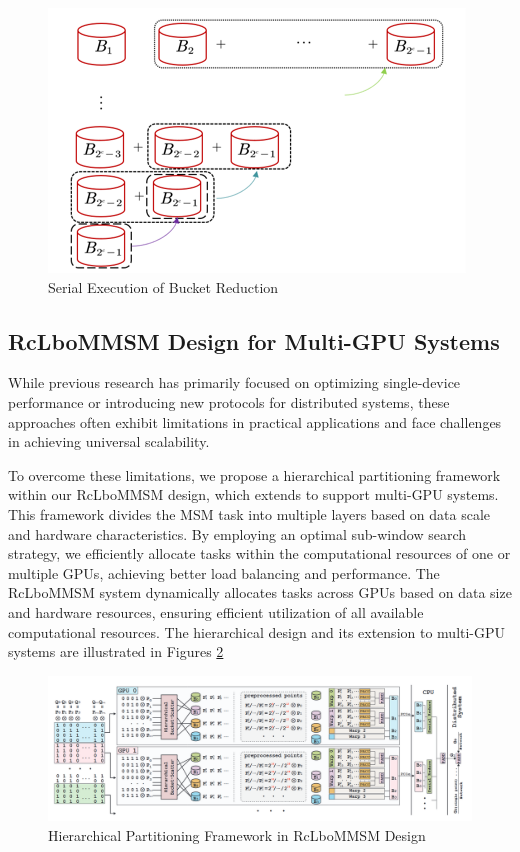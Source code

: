 \documentclass[conference]{IEEEtran}
\begin{document}
\begin{figure}[h]
    \centering
    \label{fig:bucket_reduction}
    \includegraphics[width=1\linewidth]{image/bucket_reduction.png}
    \caption{Serial Execution of Bucket Reduction}
\end{figure}


\subsection{RcLboMMSM Design for Multi-GPU Systems}

While previous research has primarily focused on optimizing single-device performance or introducing new protocols for distributed systems, these approaches often exhibit limitations in practical applications and face challenges in achieving universal scalability.

To overcome these limitations, we propose a hierarchical partitioning framework within our RcLboMMSM design, which extends to support multi-GPU systems. This framework divides the MSM task into multiple layers based on data scale and hardware characteristics. By employing an optimal sub-window search strategy, we efficiently allocate tasks within the computational resources of one or multiple GPUs, achieving better load balancing and performance. The RcLboMMSM system dynamically allocates tasks across GPUs based on data size and hardware resources, ensuring efficient utilization of all available computational resources. The hierarchical design and its extension to multi-GPU systems are illustrated in Figures \ref{fig:RcLboMMSM_multi_gpu_framework}

\begin{figure}[h]
\centering
\includegraphics[width=1\linewidth]{image/framework.png}
\caption{Hierarchical Partitioning Framework in RcLboMMSM Design}
\label{fig:RcLboMMSM_multi_gpu_framework}
\end{figure}
\end{document}
